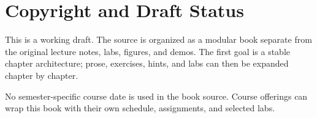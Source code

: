 \chapter*{Copyright and Draft Status}

This is a working draft. The source is organized as a modular book separate
from the original lecture notes, labs, figures, and demos. The first goal is a
stable chapter architecture; prose, exercises, hints, and labs can then be
expanded chapter by chapter.

No semester-specific course date is used in the book source. Course offerings
can wrap this book with their own schedule, assignments, and selected labs.
